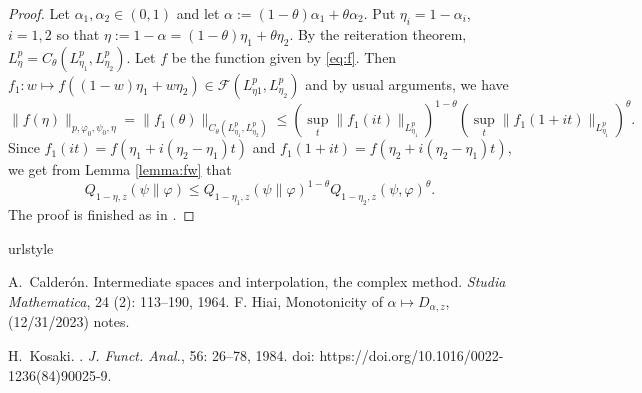 \documentclass[12pt]{article}
\theoremstyle{definition}
\theoremstyle{remark}
\def\Fe{\mathcal F}
\begin{document}
\begin{proof} Let $\alpha_1,\alpha_2\in (0,1)$ and let
$\alpha:=(1-\theta)\alpha_1+\theta\alpha_2$. Put $\eta_i=1-\alpha_i$, $i=1,2$ so that
$\eta:=1-\alpha=(1-\theta)\eta_1+\theta\eta_2$. By the reiteration theorem,
$L^p_\eta=C_\theta(L^p_{\eta_1},L^p_{\eta_2})$. Let $f$ be the function given by
\eqref{eq:f}. Then $f_1:w\mapsto f((1-w)\eta_1+w\eta_2)\in \Fe(L^p_{\eta1},L^p_{\eta_2})$ and
by usual arguments, we have
\[
\|f(\eta)\|_{p,\varphi_0,\psi_0,\eta}=\|f_1(\theta)\|_{C_\theta(L^p_{\eta_1},L^p_{\eta_2})}\le 
(\sup_t\|f_1(it)\|_{L^p_{\eta_1}})^{1-\theta}(\sup_t\|f_1(1+it)\|_{L^p_{\eta_1}})^\theta.
\]
Since $f_1(it)=f(\eta_1+i(\eta_2-\eta_1)t)$ and $f_1(1+it)=f(\eta_2+i(\eta_2-\eta_1)t)$,
we get from Lemma \ref{lemma:fw} that
\[
Q_{1-\eta,z}(\psi\|\varphi)\le
Q_{1-\eta_1,z}(\psi\|\varphi)^{1-\theta}Q_{1-\eta_2,z}(\psi,\varphi)^\theta.
\]
The proof is finished as in  \cite{FHnote6}.


\end{proof}

\begin{thebibliography}{2}
\providecommand{\natexlab}[1]{#1}
\providecommand{\url}[1]{\texttt{#1}}
\expandafter\ifx\csname urlstyle\endcsname\relax
  \providecommand{\doi}[1]{doi: #1}\else
  \providecommand{\doi}{doi: \begingroup \urlstyle{rm}\Url}\fi

A.~Calderón.
\newblock Intermediate spaces and interpolation, the complex method.
\newblock \emph{Studia Mathematica}, 24 (2): 113--190, 1964.
 F. Hiai, Monotonicity of $\alpha\mapsto D_{\alpha,z}$, (12/31/2023)
notes.


H.~Kosaki.
.
\newblock \emph{{J. Funct. Anal.}}, {56}: {26--78}, {1984}.
\newblock \doi{https://doi.org/10.1016/0022-1236(84)90025-9}.

\end{thebibliography}



%
%
\end{document}

